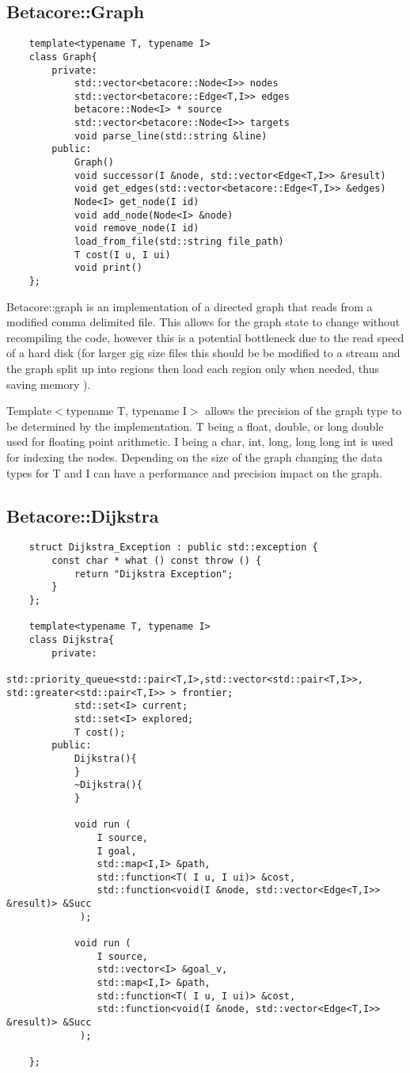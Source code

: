 \documentclass[12pt]{article}
\begin{document}
\subsection{Betacore::Graph}
\begin{lstlisting}
	template<typename T, typename I>
	class Graph{
		private:
			std::vector<betacore::Node<I>> nodes
			std::vector<betacore::Edge<T,I>> edges
			betacore::Node<I> * source
			std::vector<betacore::Node<I>> targets
			void parse_line(std::string &line)
		public:
			Graph()
			void successor(I &node, std::vector<Edge<T,I>> &result)
			void get_edges(std::vector<betacore::Edge<T,I>> &edges)
			Node<I> get_node(I id)
			void add_node(Node<I> &node)
			void remove_node(I id)
			load_from_file(std::string file_path)
			T cost(I u, I ui)
			void print()
	};
\end{lstlisting}

Betacore::graph is an implementation of a directed graph that reads from a
modified comma delimited file. This allows for the graph state to change
without recompiling the code, however this is a potential bottleneck due to
the read speed of a hard disk (for larger gig size files this should be
be modified to a stream and the graph split up into regions then load each region
only when needed, thus saving memory ). 

Template$<$typename T, typename I$>$ allows the precision of the graph type to 
be determined by the implementation. T being a float, double, or long double
used for floating point arithmetic. I being a char, int, long, long long int is
used for indexing the nodes. Depending on the size of the graph changing the 
data types for T and I can have a performance and precision impact on the graph.

\subsection{Betacore::Dijkstra}  \label{betadij}
\begin{lstlisting}
	struct Dijkstra_Exception : public std::exception {
		const char * what () const throw () {
			return "Dijkstra Exception";
		}
	};

	template<typename T, typename I>
	class Dijkstra{
		private:
			std::priority_queue<std::pair<T,I>,std::vector<std::pair<T,I>>, std::greater<std::pair<T,I>> > frontier;
			std::set<I> current; 
			std::set<I> explored;
			T cost();
		public:
			Dijkstra(){
			}
			~Dijkstra(){
			}
		
			void run (
				I source,
				I goal,
				std::map<I,I> &path,
				std::function<T( I u, I ui)> &cost,
				std::function<void(I &node, std::vector<Edge<T,I>> &result)> &Succ
			 );
		
			void run (
				I source,
				std::vector<I> &goal_v,
				std::map<I,I> &path,
				std::function<T( I u, I ui)> &cost,
				std::function<void(I &node, std::vector<Edge<T,I>> &result)> &Succ
			 );
	
	};
\end{lstlisting}
\end{document}
